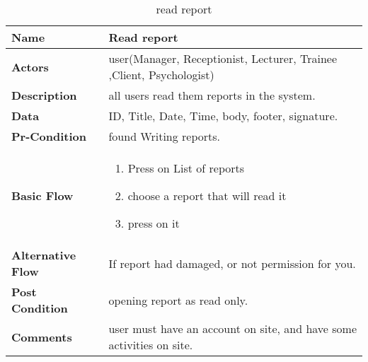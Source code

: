 \documentclass[../Psychological_system_web_application.tex]{subfiles}
\begin{document}
	\begin{center}
		\begin{table}[h]
			\begin{tabular}{ | m{4cm} | m{10cm}| } 
				\hline
			 	\textbf{\large Name}& Read report\\ 
				\hline
			  	\textbf{\large Actors}& user(Manager, Receptionist, Lecturer, Trainee ,Client, Psychologist)\\ 
				\hline
			  	\textbf{\large Description}& all users read them reports in the system.\\ 
				\hline
				\textbf{\large Data}& ID, Title, Date, Time, body, footer, signature.\\ 
				\hline
				 \textbf{\large Pr-Condition}& found Writing reports. \\ 
				\hline
				\textbf{\large Basic Flow}&\begin{enumerate}
				\item
					Press on List of reports
				\item
					choose a report that will read it
				\item 
					press on it \end{enumerate}\\
					\hline
				\textbf{\large Alternative Flow}& If report had damaged, or not permission for you.\\ 
				\hline
				\textbf{\large Post Condition}& opening report as read only.\\ 
				\hline
				\textbf{\large Comments}& user must have an account on site, and have some activities on site.\\ 
				\hline
			\end{tabular}
			\caption{read report}
			\label{table:READ-REPORT}
		\end{table}
	\end{center}
	
\end{document}
